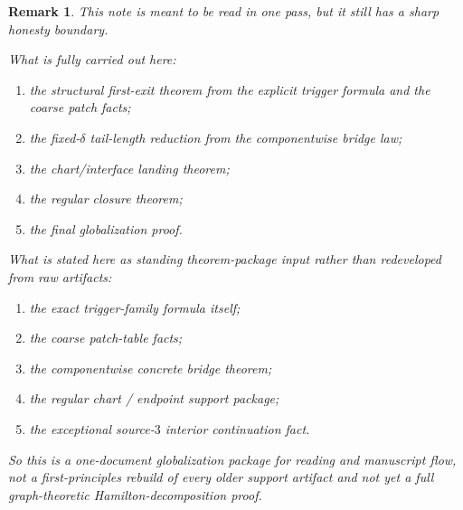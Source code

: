 \documentclass[11pt]{article}
\newtheorem{remark}[theorem]{Remark}
\begin{document}
\begin{remark}
This note is meant to be read in one pass, but it still has a sharp honesty
boundary.

What is fully carried out here:
\begin{enumerate}[label=\textup{(\arabic*)},leftmargin=2.5em]
\item the structural first-exit theorem from the explicit trigger formula and
      the coarse patch facts;
\item the fixed-$\delta$ tail-length reduction from the componentwise bridge
      law;
\item the chart/interface landing theorem;
\item the regular closure theorem;
\item the final globalization proof.
\end{enumerate}

What is stated here as standing theorem-package input rather than redeveloped
from raw artifacts:
\begin{enumerate}[label=\textup{(\arabic*)},leftmargin=2.5em]
\item the exact trigger-family formula itself;
\item the coarse patch-table facts;
\item the componentwise concrete bridge theorem;
\item the regular chart / endpoint support package;
\item the exceptional source-$3$ interior continuation fact.
\end{enumerate}

So this is a one-document globalization package for reading and manuscript
flow, not a first-principles rebuild of every older support artifact and not
yet a full graph-theoretic Hamilton-decomposition proof.
\end{remark}
\end{document}

